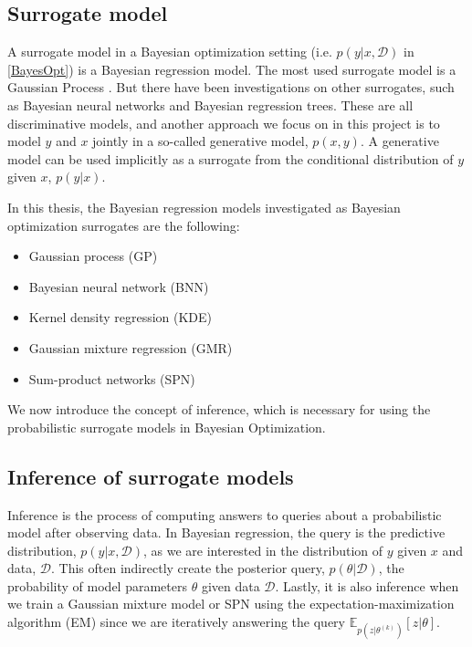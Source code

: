 \subsection{Surrogate model}
A surrogate model in a Bayesian optimization setting (i.e. $p(y|x,\mathcal{D})$ in \eqref{BayesOpt})
is a Bayesian regression model. The most used surrogate model is a Gaussian Process \cite{??}. But there have
been investigations on other surrogates, such as Bayesian neural networks and Bayesian regression
trees. These are all discriminative models, and another approach we focus on in this project is to
model $y$ and $x$ jointly in a so-called generative model, $p(x,y)$. A generative model can be used
implicitly as a surrogate from the conditional distribution of $y$ given $x$, $p(y|x)$.

In this thesis, the Bayesian regression models investigated as Bayesian optimization surrogates are
the following:
\begin{itemize}[noitemsep]
    \item Gaussian process (GP)
    \item Bayesian neural network (BNN)
    \item Kernel density regression (KDE)
    \item Gaussian mixture regression (GMR)
    \item Sum-product networks (SPN)
\end{itemize}

We now introduce the concept of inference, which is necessary for using the probabilistic surrogate models
in Bayesian Optimization. 

\subsection{Inference of surrogate models}
Inference is the process of computing answers to queries about a probabilistic model after observing
data. In Bayesian regression, the query is the predictive distribution, $p(y|x,\mathcal{D})$, as we
are interested in the distribution of $y$ given $x$ and data, $\mathcal{D}$. This
often indirectly create the posterior query, $p(\theta|\mathcal{D})$, the probability of model
parameters $\theta$ given data $\mathcal{D}$. Lastly, it is also inference when we train a Gaussian
mixture model or SPN using the expectation-maximization algorithm (EM) since we are iteratively
answering the query $\mathbb{E}_{p(z|\theta^{(k)})}[z|\theta]$.

